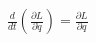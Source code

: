 \documentclass[preview,border=6pt]{standalone}
\begin{document}
\fontsize{40.000000}{48.000000}\selectfont
$\displaystyle \frac{d}{dt} \left( \frac{\partial L}{\partial \dot{q}} \right) = \frac{\partial L}{\partial q}$
\end{document}
